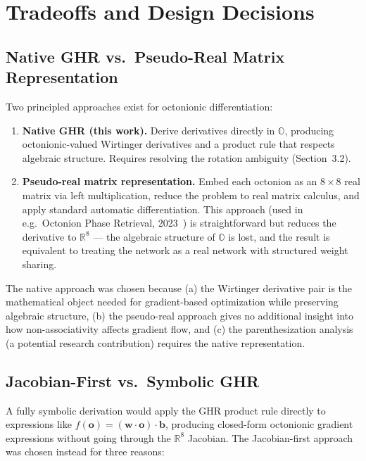\documentclass[11pt]{article}
\newcommand{\OO}{\mathbb{O}}
\newcommand{\RR}{\mathbb{R}}
\begin{document}
\section{Tradeoffs and Design Decisions}

\subsection{Native GHR vs.\ Pseudo-Real Matrix Representation}

Two principled approaches exist for octonionic differentiation:

\begin{enumerate}
  \item \textbf{Native GHR (this work).}  Derive derivatives directly in $\OO$,
        producing octonionic-valued Wirtinger derivatives and a product rule that
        respects algebraic structure.  Requires resolving the rotation ambiguity
        (Section~3.2).
  \item \textbf{Pseudo-real matrix representation.}  Embed each octonion as an
        $8\times 8$ real matrix via left multiplication, reduce the problem to
        real matrix calculus, and apply standard automatic differentiation.  This
        approach (used in e.g.\ Octonion Phase Retrieval, 2023~\cite{opr2023}) is
        straightforward but reduces the derivative to $\RR^8$ --- the algebraic
        structure of $\OO$ is lost, and the result is equivalent to treating the
        network as a real network with structured weight sharing.
\end{enumerate}

The native approach was chosen because (a) the Wirtinger derivative pair is the
mathematical object needed for gradient-based optimization while preserving
algebraic structure, (b) the pseudo-real approach gives no additional insight
into how non-associativity affects gradient flow, and (c) the parenthesization
analysis (a potential research contribution) requires the native representation.

\subsection{Jacobian-First vs.\ Symbolic GHR}

A fully symbolic derivation would apply the GHR product rule
directly to expressions like $f(\mathbf{o}) = (\mathbf{w} \cdot \mathbf{o}) \cdot \mathbf{b}$,
producing closed-form octonionic gradient expressions without going through the
$\RR^8$ Jacobian.  The Jacobian-first approach was chosen instead for three
reasons:
\end{document}
